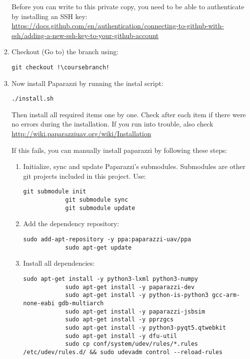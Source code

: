 \begin{enumerate}
	Before you can write to this private copy, you need to be able to authenticate by installing an SSH key: \href{https://docs.github.com/en/authentication/connecting-to-github-with-ssh/adding-a-new-ssh-key-to-your-github-account}{https://docs.github.com/en/authentication/connecting-to-github-with-ssh/adding-a-new-ssh-key-to-your-github-account}

	\item Checkout (Go to) the \coursebranch{} branch using:
	\begin{lstlisting}[style=Bash]
		git checkout !\coursebranch!
	\end{lstlisting}



	\item Now install Paparazzi by running the instal script:
	\begin{lstlisting}[style=Bash]
		./install.sh
	\end{lstlisting}

	Then install all required items one by one. Check after each item if there were no errors during the installation. If you run into trouble, also check \url{http://wiki.paparazziuav.org/wiki/Installation}

	If this fails, you can manually install paparazzi by following these steps:

	\begin{enumerate}
		\item Initialize, sync and update Paparazzi's submodules. Submodules are other git projects included in this project. Use:
		\begin{lstlisting}[style=Bash]
			git submodule init
			git submodule sync
			git submodule update
		\end{lstlisting}

		\item Add the dependency repository:
		\begin{lstlisting}[style=Bash]
			sudo add-apt-repository -y ppa:paparazzi-uav/ppa
			sudo apt-get update
		\end{lstlisting}

		\item Install all dependencies:
		\begin{lstlisting}[style=Bash]
			sudo apt-get install -y python3-lxml python3-numpy
			sudo apt-get install -y paparazzi-dev
			sudo apt-get install -y python-is-python3 gcc-arm-none-eabi gdb-multiarch
			sudo apt-get install -y paparazzi-jsbsim
			sudo apt-get install -y pprzgcs
			sudo apt-get install -y python3-pyqt5.qtwebkit
			sudo apt-get install -y dfu-util
			sudo cp conf/system/udev/rules/*.rules /etc/udev/rules.d/ && sudo udevadm control --reload-rules
		\end{lstlisting}
	

\end{enumerate}
\end{enumerate}
